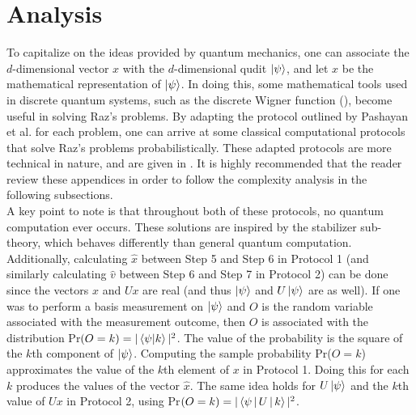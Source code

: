 \documentclass[../3Wworkreport.tex]{subfiles}
\begin{document}
\section{Analysis}
\label{sec:analysis}

To capitalize on the ideas provided by quantum mechanics, one can associate the $d$-dimensional vector $x$ with the $d$-dimensional qudit $\ket{\psi}$, and let $x$ be the mathematical representation of $\ket{\psi}$. In doing this, some mathematical tools used in discrete quantum systems, such as the discrete Wigner function (), become useful in solving Raz\rq{}s problems. By adapting the protocol outlined by Pashayan et al. \parencite*{Pashayan2014} for each problem, one can arrive at some classical computational protocols that solve Raz\rq{}s problems probabilistically. These adapted protocols are more technical in nature, and are given in . It is highly recommended that the reader review these appendices in order to follow the complexity analysis in the following subsections.\\

A key point to note is that throughout both of these protocols, no quantum computation ever occurs. These solutions are inspired by the stabilizer sub-theory, which behaves differently than general quantum computation. Additionally, calculating $\hat{x}$ between Step 5 and Step 6 in Protocol 1 (and similarly calculating $\hat{v}$ between Step 6 and Step 7 in Protocol 2) can be done since the vectors $x$ and $Ux$ are real (and thus $\ket{\psi}$ and $U\ket{\psi}$ are as well). If one was to perform a basis measurement on $\ket{\psi}$ and $O$ is the random variable associated with the measurement outcome, then $O$ is associated with the distribution Pr$(O = k) = |\braket{\psi|k}|^2$. The value of the probability is the square of the $k$th component of $\ket{\psi}$. Computing the sample probability Pr($O = k$) approximates the value of the $k$th element of $x$ in Protocol 1. Doing this for each $k$ produces the values of the vector $\hat{x}$. The same idea holds for $U\ket{\psi}$ and the $k$th value of $Ux$ in Protocol 2, using Pr$(O = k) = |\Braket{\psi |U|k}|^2$.

\vspace{-0.5cm}
\end{document}
